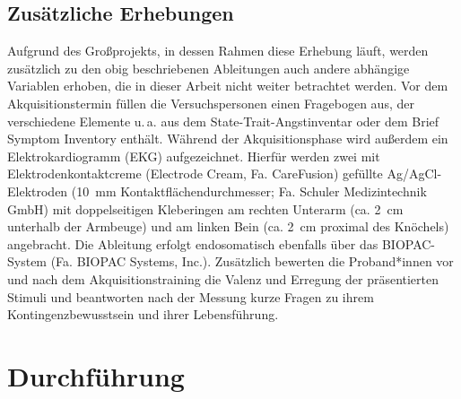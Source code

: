 			
		\subsection{Zusätzliche Erhebungen}\label{ableitungen}
			Aufgrund des Großprojekts, in dessen Rahmen diese Erhebung läuft, werden zusätzlich zu den obig beschriebenen Ableitungen auch andere abhängige Variablen erhoben, die in dieser Arbeit nicht weiter betrachtet werden. Vor dem Akquisitionstermin füllen die Versuchspersonen einen Fragebogen aus, der verschiedene Elemente u.\,a. aus dem State-Trait-Angstinventar \parencite{STAI} oder dem Brief Symptom Inventory \parencite{BSI} enthält.
			Während der Akquisitionsphase wird außerdem ein Elektrokardiogramm (EKG) aufgezeichnet. Hierfür werden zwei mit Elektrodenkontaktcreme (Electrode Cream, Fa. CareFusion) gefüllte Ag/AgCl-Elektroden (\SI{10}{\milli\meter} Kontaktflächendurchmesser; Fa. Schuler Medizintechnik GmbH) mit doppelseitigen Kleberingen am rechten Unterarm (ca. \SI{2}{\centi\meter} unterhalb der Armbeuge) und am linken Bein (ca. \SI{2}{\centi\meter} proximal des Knöchels) angebracht. Die Ableitung erfolgt endosomatisch ebenfalls über das BIOPAC-System (Fa. BIOPAC Systems, Inc.). 
			Zusätzlich bewerten die Proband*innen vor und nach dem Akquisitionstraining die Valenz und Erregung der präsentierten Stimuli und beantworten nach der Messung kurze Fragen zu ihrem Kontingenzbewusstsein und ihrer Lebensführung. 



	\section{Durchführung}\label{durchführung}
